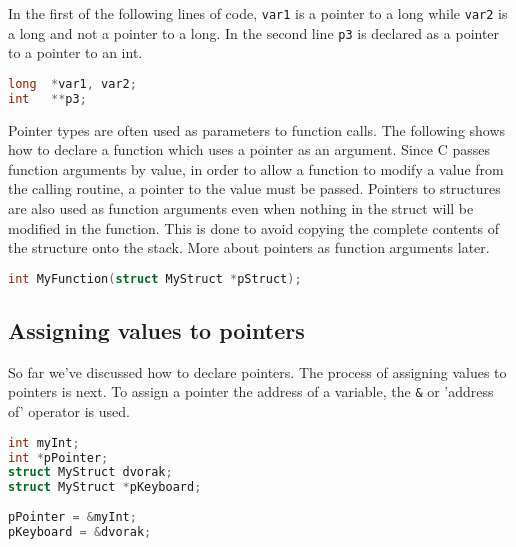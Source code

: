 In the first of the following lines of code, \texttt{var1} is a pointer to a
long while \texttt{var2} is a long and not a pointer to a long. In the second
line \texttt{p3} is declared as a pointer to a pointer to an int.
\lstset{basicstyle=\scriptsize, numbers=left, captionpos=b, tabsize=4}
\begin{lstlisting}[caption=Section \thesection listing \arabic{pntcnt},language={C},
breaklines=true,xleftmargin=15pt,label=lst:section\thesection listing\arabic{pntcnt}]
long  *var1, var2;
int   **p3;
\end{lstlisting}

Pointer types are often used as parameters to function calls. The following
shows how to declare a function which uses a pointer as an argument. Since C
passes function arguments by value, in order to allow a function to modify a
value from the calling routine, a pointer to the value must be passed. Pointers
to structures are also used as function arguments even when nothing in the
struct will be modified in the function. This is done to avoid copying the
complete contents of the structure onto the stack. More about pointers as
function arguments later.
\lstset{basicstyle=\scriptsize, numbers=left, captionpos=b, tabsize=4}
\begin{lstlisting}[caption=Section \thesection listing \arabic{pntcnt},language={C},
breaklines=true,xleftmargin=15pt,label=lst:section\thesection listing\arabic{pntcnt}]
int MyFunction(struct MyStruct *pStruct);
\end{lstlisting}

\subsection{Assigning values to pointers}
So far we've discussed how to declare pointers. The process of assigning values
to pointers is next. To assign a pointer the address of a variable, the
\texttt{\&} or 'address of' operator is used. 
\lstset{basicstyle=\scriptsize, numbers=left, captionpos=b, tabsize=4}
\begin{lstlisting}[caption=Section \thesection listing \arabic{pntcnt},language={C},
breaklines=true,xleftmargin=15pt,label=lst:section\thesection listing\arabic{pntcnt}]
int myInt;
int *pPointer;
struct MyStruct dvorak;
struct MyStruct *pKeyboard;
 
pPointer = &myInt;
pKeyboard = &dvorak;
\end{lstlisting}

